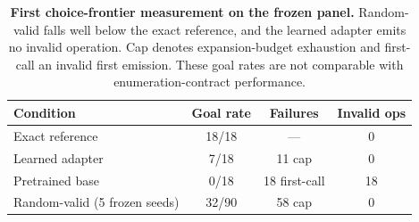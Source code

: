 \begin{table}[t]
\caption{\textbf{First choice-frontier measurement on the frozen panel.} Random-valid falls well below the exact reference, and the learned adapter emits no invalid operation. Cap denotes expansion-budget exhaustion and first-call an invalid first emission. These goal rates are not comparable with enumeration-contract performance.}
\label{tab:results-cf}
\centering\footnotesize
\setlength{\tabcolsep}{2.5pt}
\begin{tabular}{lccc}
\toprule[0.4mm]
\rowcolor{mygray}\textbf{Condition} & \textbf{Goal rate} & \textbf{Failures} & \textbf{Invalid ops} \\
\midrule
Exact reference & 18/18 & --- & 0 \\
Learned adapter & 7/18 & 11 cap & 0 \\
Pretrained base & 0/18 & 18 first-call & 18 \\
Random-valid (5 frozen seeds) & 32/90 & 58 cap & 0 \\
\bottomrule
\end{tabular}
\end{table}

